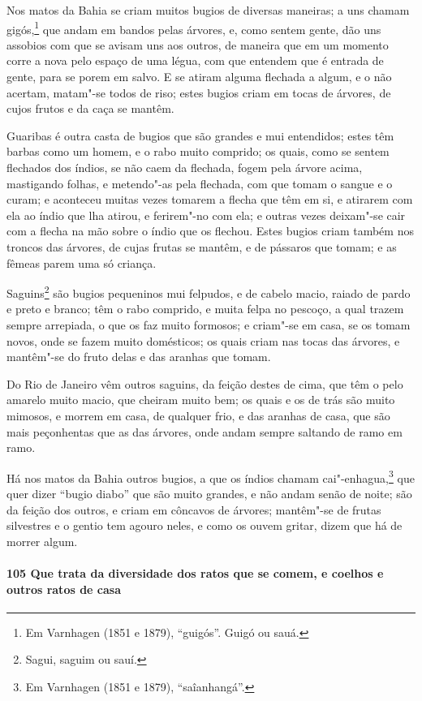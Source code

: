 Nos matos da Bahia se criam muitos bugios de diversas maneiras; a uns chamam
gigós,\footnote{ Em Varnhagen (1851 e 1879), ``guigós''. Guigó ou sauá.} que andam em
bandos pelas árvores, e, como sentem gente, dão uns assobios com que se avisam uns aos
outros, de maneira que em um momento corre a nova pelo espaço de uma légua, com que
entendem que é entrada de gente, para se porem em salvo. E se atiram alguma flechada a
algum, e o não acertam, matam"-se todos de riso; estes bugios criam em tocas de árvores, de
cujos frutos e da caça se mantêm.

Guaribas é outra casta de bugios que são grandes e mui entendidos; estes têm barbas como
um homem, e o rabo muito comprido; os quais, como se sentem flechados dos índios, se não
caem da flechada, fogem pela árvore acima, mastigando folhas, e metendo"-as pela flechada,
com que tomam o sangue e o curam; e aconteceu muitas vezes tomarem a flecha que têm em si,
e atirarem com ela ao índio que lha atirou, e ferirem"-no com ela; e outras vezes deixam"-se
cair com a flecha na mão sobre o índio que os flechou. Estes bugios criam também nos
troncos das árvores, de cujas frutas se mantêm, e de pássaros que tomam; e as fêmeas parem
uma só criança.

Saguins\footnote{ Sagui, saguim ou sauí.} são bugios pequeninos mui felpudos, e de cabelo
macio, raiado de pardo e preto e branco; têm o rabo comprido, e muita felpa no pescoço, a
qual trazem sempre arrepiada, o que os faz muito formosos; e criam"-se em casa, se os tomam
novos, onde se fazem muito domésticos; os quais criam nas tocas das árvores, e mantêm"-se
do fruto delas e das aranhas que tomam.

Do Rio de Janeiro vêm outros saguins, da feição destes de cima, que têm o pelo amarelo
muito macio, que cheiram muito bem; os quais e os de trás são muito mimosos, e morrem em
casa, de qualquer frio, e das aranhas de casa, que são mais peçonhentas que as das
árvores, onde andam sempre saltando de ramo em ramo.

Há nos matos da Bahia outros bugios, a que os índios chamam cai"-enhagua,\footnote{ Em
Varnhagen (1851 e 1879), ``saîanhangá''.} que quer dizer ``bugio diabo'' que são muito
grandes, e não andam senão de noite; são da feição dos outros, e criam em côncavos de
árvores; mantêm"-se de frutas silvestres e o gentio tem agouro neles, e como os ouvem
gritar, dizem que há de morrer algum.

\paragraph{105 Que trata da diversidade dos ratos que se comem, e coelhos e outros ratos
de casa}

